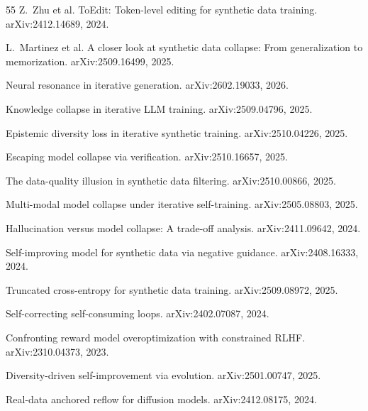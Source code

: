 \documentclass[11pt]{article}
\begin{document}
\begin{thebibliography}{55}
Z.~Zhu et al.
\newblock ToEdit: Token-level editing for synthetic data training.
\newblock arXiv:2412.14689, 2024.

L.~Martinez et al.
\newblock A closer look at synthetic data collapse: From generalization to memorization.
\newblock arXiv:2509.16499, 2025.

Neural resonance in iterative generation.
\newblock arXiv:2602.19033, 2026.

Knowledge collapse in iterative LLM training.
\newblock arXiv:2509.04796, 2025.

Epistemic diversity loss in iterative synthetic training.
\newblock arXiv:2510.04226, 2025.

Escaping model collapse via verification.
\newblock arXiv:2510.16657, 2025.

The data-quality illusion in synthetic data filtering.
\newblock arXiv:2510.00866, 2025.

Multi-modal model collapse under iterative self-training.
\newblock arXiv:2505.08803, 2025.

Hallucination versus model collapse: A trade-off analysis.
\newblock arXiv:2411.09642, 2024.

Self-improving model for synthetic data via negative guidance.
\newblock arXiv:2408.16333, 2024.

Truncated cross-entropy for synthetic data training.
\newblock arXiv:2509.08972, 2025.

Self-correcting self-consuming loops.
\newblock arXiv:2402.07087, 2024.

Confronting reward model overoptimization with constrained RLHF.
\newblock arXiv:2310.04373, 2023.

Diversity-driven self-improvement via evolution.
\newblock arXiv:2501.00747, 2025.

Real-data anchored reflow for diffusion models.
\newblock arXiv:2412.08175, 2024.


\end{thebibliography}
\end{document}
